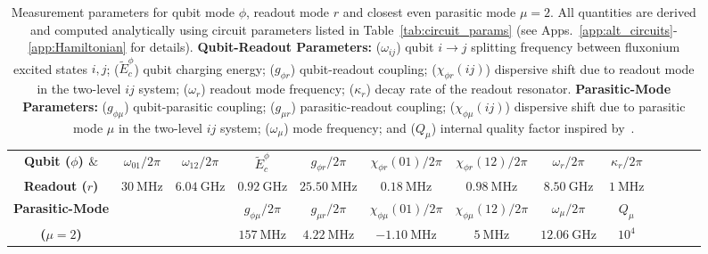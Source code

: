 \documentclass[%
reprint,
superscriptaddress,
 amsmath,amssymb,
 aps,
 prx,
longbibliography,
floatfix,
]{revtex4-2}
\begin{document}
\begin{table}[tb]
    \centering
\begin{tabular}{|c|c|c|c|c|c|c|c|c|c|c|c|c|}
    \hline
    \textbf{Qubit ($\phi$) $\&$}&$\omega_{01}/2\pi$&$\omega_{12}/2\pi$ &$\tilde{E}^\phi_c$ &$g_{\phi r}/2\pi$&$\chi_{\phi r}(01)/2\pi$&$\chi_{\phi r}(12)/2\pi$&$\omega_r/2\pi$&$\kappa_r/2\pi$\\
    \cline{2-9}
\textbf{Readout ($r$)}&$30 \ \mathrm{MHz}$& $6.04 \ \mathrm{GHz}$ & $0.92 \ \mathrm{GHz}$& $25.50 \ \mathrm{MHz}$& $0.18 \ \mathrm{MHz}$&$0.98 \ \mathrm{MHz}$&$8.50 \ \mathrm{GHz}$&$1 \ \mathrm{MHz}$\\    
\hline\textbf{Parasitic-Mode} & \multicolumn{2}{c|}{} & $g_{\phi\mu}/2\pi$&$g_{\mu r}/2\pi$&$\chi_{\phi\mu}(01)/2\pi$&$\chi_{\phi\mu}(12)/2\pi$&$\omega_\mu/2\pi$&$Q_\mu$\\
    \cline{4-9}
\textbf{($\mu=2$)}&\multicolumn{2}{c|}{} &$157 \ \mathrm{MHz}$& $4.22 \ \mathrm{MHz}$& $-1.10 \ \mathrm{MHz}$& $5 \ \mathrm{MHz}$& $12.06 \ \mathrm{GHz}$&$10^{4}$\\    
\hline
\end{tabular}
\caption{Measurement parameters for qubit mode $\phi$, readout mode $r$ and closest even parasitic mode $\mu=2$.  All quantities are derived and computed analytically using circuit parameters listed in Table~\ref{tab:circuit_params} (see Apps.~\ref{app:alt_circuits}-\ref{app:Hamiltonian} for details). \textbf{Qubit-Readout Parameters:} ($\omega_{ij}$) qubit $i\rightarrow j$ splitting frequency between fluxonium excited states $i, j$; ($\tilde{E}^\phi_c$) qubit charging energy; ($g_{\phi r}$) qubit-readout coupling; ($\chi_{\phi r}(ij)$) dispersive shift due to readout mode in the two-level $ij$ system; ($\omega_r$) readout mode frequency; ($\kappa_r$) decay rate of the readout resonator. \textbf{Parasitic-Mode Parameters:} ($g_{\phi \mu}$) qubit-parasitic coupling; ($g_{\mu r}$) parasitic-readout coupling; ($\chi_{\phi \mu}(ij)$) dispersive shift due to parasitic mode $\mu$ in the two-level $ij$ system; ($\omega_\mu$) mode frequency; and ($Q_\mu$) internal quality factor inspired by~\cite{masluk_microwave_2012}.}   \label{tab:readout_params}
\end{table}



\end{document}
